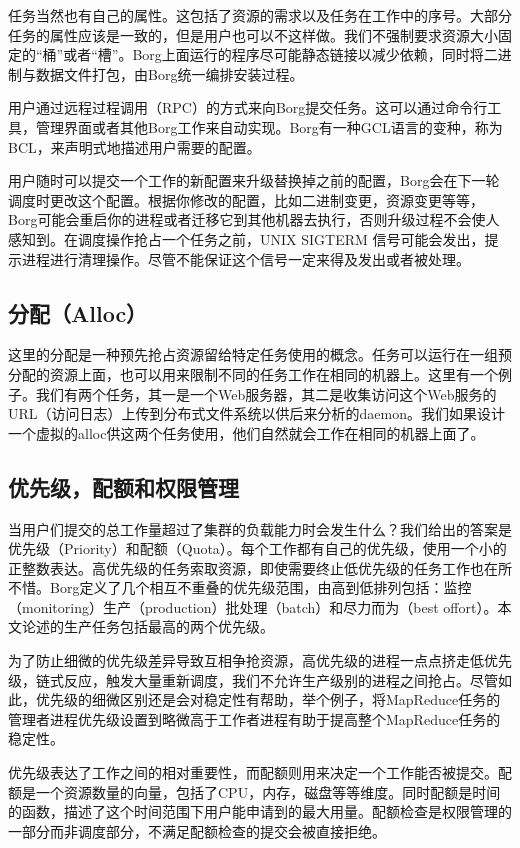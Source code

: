 任务当然也有自己的属性。这包括了资源的需求以及任务在工作中的序号。大部分任务的属性应该是一致的，但是用户也可以不这样做。我们不强制要求资源大小固定的“桶”或者“槽”。Borg上面运行的程序尽可能静态链接以减少依赖，同时将二进制与数据文件打包，由Borg统一编排安装过程。

用户通过远程过程调用（RPC）的方式来向Borg提交任务。这可以通过命令行工具，管理界面或者其他Borg工作来自动实现。Borg有一种GCL语言的变种，称为BCL，来声明式地描述用户需要的配置。

用户随时可以提交一个工作的新配置来升级替换掉之前的配置，Borg会在下一轮调度时更改这个配置。根据你修改的配置，比如二进制变更，资源变更等等，Borg可能会重启你的进程或者迁移它到其他机器去执行，否则升级过程不会使人感知到。在调度操作抢占一个任务之前，UNIX SIGTERM 信号可能会发出，提示进程进行清理操作。尽管不能保证这个信号一定来得及发出或者被处理。

\subsection{分配（Alloc）}

这里的分配是一种预先抢占资源留给特定任务使用的概念。任务可以运行在一组预分配的资源上面，也可以用来限制不同的任务工作在相同的机器上。这里有一个例子。我们有两个任务，其一是一个Web服务器，其二是收集访问这个Web服务的URL（访问日志）上传到分布式文件系统以供后来分析的daemon。我们如果设计一个虚拟的alloc供这两个任务使用，他们自然就会工作在相同的机器上面了。

\subsection{优先级，配额和权限管理}

当用户们提交的总工作量超过了集群的负载能力时会发生什么？我们给出的答案是优先级（Priority）和配额（Quota）。每个工作都有自己的优先级，使用一个小的正整数表达。高优先级的任务索取资源，即使需要终止低优先级的任务工作也在所不惜。Borg定义了几个相互不重叠的优先级范围，由高到低排列包括：监控（monitoring）生产（production）批处理（batch）和尽力而为（best offort）。本文论述的生产任务包括最高的两个优先级。

为了防止细微的优先级差异导致互相争抢资源，高优先级的进程一点点挤走低优先级，链式反应，触发大量重新调度，我们不允许生产级别的进程之间抢占。尽管如此，优先级的细微区别还是会对稳定性有帮助，举个例子，将MapReduce任务的管理者进程优先级设置到略微高于工作者进程有助于提高整个MapReduce任务的稳定性。

优先级表达了工作之间的相对重要性，而配额则用来决定一个工作能否被提交。配额是一个资源数量的向量，包括了CPU，内存，磁盘等等维度。同时配额是时间的函数，描述了这个时间范围下用户能申请到的最大用量。配额检查是权限管理的一部分而非调度部分，不满足配额检查的提交会被直接拒绝。

